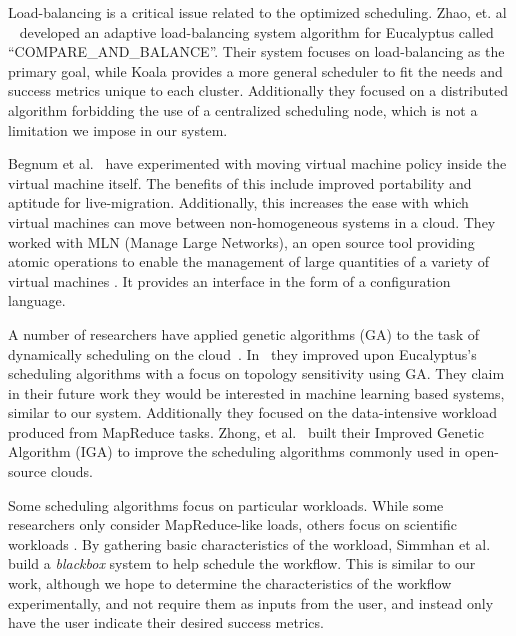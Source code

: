 Load-balancing is a critical issue related to the optimized scheduling.  Zhao,
et. al ~\cite{Zhao} developed an adaptive load-balancing system algorithm for
Eucalyptus called ``COMPARE\_AND\_BALANCE''.  Their system focuses on
load-balancing as the primary goal, while Koala provides a more general
scheduler to fit the needs and success metrics unique to each cluster.
Additionally they focused on a distributed algorithm forbidding the use of a
centralized scheduling node, which is not a limitation we impose in our system.


Begnum et al.~\cite{Begnum} have experimented with moving virtual machine policy
inside the virtual machine itself.  The benefits of this include improved
portability and aptitude for live-migration.  Additionally, this increases the
ease with which virtual machines can move between non-homogeneous systems
in a cloud.  They worked with MLN (Manage Large Networks), an open source tool
providing atomic operations to enable the management of large quantities of a
variety of virtual machines \cite{Xen,UML,VMware}.  It provides an interface in
the form of a configuration language.


A number of researchers have applied genetic algorithms (GA) to the task of
dynamically scheduling on the cloud~\cite{Lee,Zhong,Chenhong}.  In~\cite{Lee}
they improved upon Eucalyptus's scheduling algorithms with a focus on topology
sensitivity using GA.  They claim in their future work they would be interested
in machine learning based systems, similar to our system.  Additionally they
focused on the data-intensive workload produced from MapReduce tasks. Zhong, et
al.~\cite{Zhong} built their Improved Genetic Algorithm (IGA) to improve the
scheduling algorithms commonly used in open-source clouds.


Some scheduling algorithms focus on particular workloads.  While some
researchers only consider MapReduce-like loads, others focus on scientific
workloads \cite{Juve,Simmhan,Hoffa}.  By gathering basic characteristics of the
workload, Simmhan et al.~\cite{Simmhan} build a \emph{blackbox} system to help
schedule the workflow.  This is similar to our work, although we hope to
determine the characteristics of the workflow experimentally, and not require
them as inputs from the user, and instead only have the user indicate their
desired success metrics.
